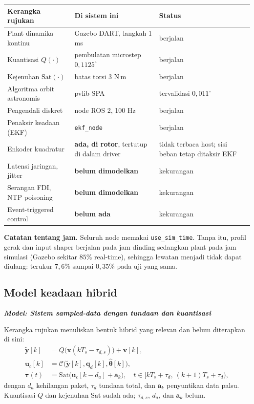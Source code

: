 \documentclass[11pt,a4paper]{article}
\newcommand{\degg}{^\circ}
\newcommand{\model}[1]{\textbf{\textit{Model: #1}}}
\begin{document}
\begin{longtable}{p{5.2cm} p{5.6cm} p{4.0cm}}
\toprule
\textbf{Kerangka rujukan} & \textbf{Di sistem ini} & \textbf{Status} \\
\midrule
\endhead
Plant dinamika kontinu & Gazebo DART, langkah 1 ms & berjalan \\
Kuantisasi $Q(\cdot)$ & pembulatan microstep $0{,}1125\degg$ & berjalan \\
Kejenuhan $\mathrm{Sat}(\cdot)$ & batas torsi $3$ N\,m & berjalan \\
Algoritma orbit astronomis & pvlib SPA & tervalidasi $0{,}011\degg$ \\
Pengendali diskret & node ROS 2, 100 Hz & berjalan \\
Penaksir keadaan (EKF) & \texttt{ekf\_node} & berjalan \\
Enkoder kuadratur & \textbf{ada, di rotor}, tertutup di dalam driver & tidak terbaca host; sisi beban tetap ditaksir EKF \\
Latensi jaringan, jitter & \textbf{belum dimodelkan} & kekurangan \\
Serangan FDI, NTP poisoning & \textbf{belum dimodelkan} & kekurangan \\
Event-triggered control & \textbf{belum ada} & kekurangan \\
\bottomrule
\end{longtable}

\textbf{Catatan tentang jam.} Seluruh node memakai \texttt{use\_sim\_time}. Tanpa itu, profil gerak dan
input shaper berjalan pada jam dinding sedangkan plant pada jam simulasi (Gazebo sekitar $85\%$
real-time), sehingga lewatan menjadi tidak dapat diulang: terukur $7{,}6\%$ sampai $0{,}35\%$ pada uji
yang sama.

\subsection{Model keadaan hibrid}

\model{Sistem sampled-data dengan tundaan dan kuantisasi}

Kerangka rujukan menuliskan bentuk hibrid yang relevan dan belum diterapkan di sini:
\begin{align}
\tilde{\bm{y}}[k] &= Q\big( \bm{x}(kT_s - \tau_{d,s}) \big) + \bm{v}[k], \\
\bm{u}_c[k] &= \mathcal{C}\big( \tilde{\bm{y}}[k], \bm{q}_d[k], \hat{\bm{\theta}}[k] \big), \\
\bm{\tau}(t) &= \mathrm{Sat}\big( \bm{u}_c[k - d_a] + \bm{a}_k \big),
\quad t \in [kT_s + \tau_d,\ (k+1)T_s + \tau_d),
\end{align}
dengan $d_a$ kehilangan paket, $\tau_d$ tundaan total, dan $\bm{a}_k$ penyuntikan data palsu. Kuantisasi
$Q$ dan kejenuhan $\mathrm{Sat}$ sudah ada; $\tau_{d,s}$, $d_a$, dan $\bm{a}_k$ belum.
\end{document}
